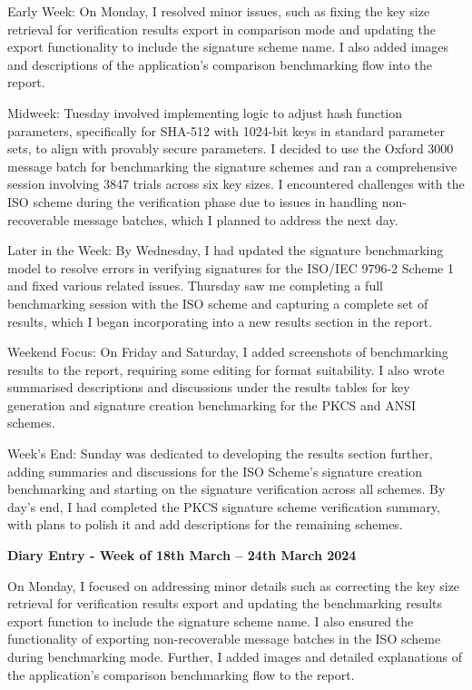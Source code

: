 \documentclass[]{final_report}
\theoremstyle{definition}
\begin{document}
Early Week:
On Monday, I resolved minor issues, such as fixing the key size retrieval for verification results export in comparison
mode and updating the export functionality to include the signature scheme name. I also added images and descriptions of
the application's comparison benchmarking flow into the report.

Midweek:
Tuesday involved implementing logic to adjust hash function parameters, specifically for SHA-512 with 1024-bit keys in
standard parameter sets, to align with provably secure parameters. I decided to use the Oxford 3000 message batch for
benchmarking the signature schemes and ran a comprehensive session involving 3847 trials across six key sizes. I
encountered challenges with the ISO scheme during the verification phase due to issues in handling non-recoverable
message batches, which I planned to address the next day.

Later in the Week:
By Wednesday, I had updated the signature benchmarking model to resolve errors in verifying signatures for the ISO/IEC
9796-2 Scheme 1 and fixed various related issues. Thursday saw me completing a full benchmarking session with the ISO
scheme and capturing a complete set of results, which I began incorporating into a new results section in the report.

Weekend Focus:
On Friday and Saturday, I added screenshots of benchmarking results to the report, requiring some editing for format
suitability. I also wrote summarised descriptions and discussions under the results tables for key generation and
signature creation benchmarking for the PKCS and ANSI schemes.

Week’s End:
Sunday was dedicated to developing the results section further, adding summaries and discussions for the ISO Scheme's
signature creation benchmarking and starting on the signature verification across all schemes. By day’s end, I had
completed the PKCS signature scheme verification summary, with plans to polish it and add descriptions for the remaining
schemes.

\textbf{Diary Entry - Week of 18th March – 24th March 2024}

On Monday, I focused on addressing minor details such as correcting the key size retrieval for verification
results export and updating the benchmarking results export function to include the signature scheme name. I also
ensured the functionality of exporting non-recoverable message batches in the ISO scheme during benchmarking mode.
Further, I added images and detailed explanations of the application’s comparison benchmarking flow to the report.
\end{document}
